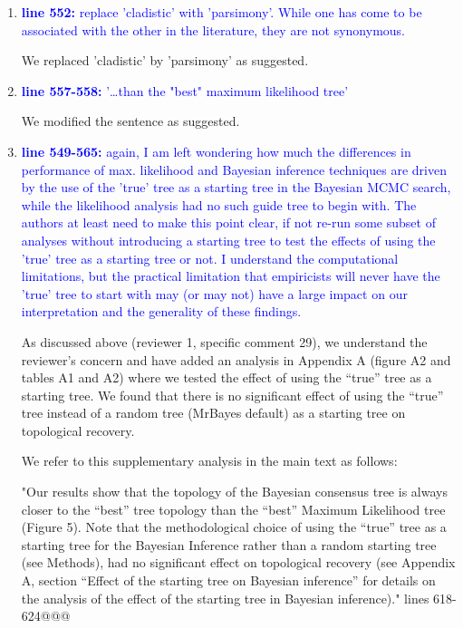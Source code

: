 \documentclass[12pt,letterpaper]{article}
\begin{document}
\begin{enumerate}
\item{\textcolor{blue}{\textbf{line 552:} replace 'cladistic' with 'parsimony'. While one has come to be associated with the other in the literature, they are not synonymous. }}

We replaced 'cladistic' by 'parsimony' as suggested.

\item{\textcolor{blue}{\textbf{line 557-558:} '…than the "best" maximum likelihood tree'}}

We modified the sentence as suggested.

\item{\textcolor{blue}{\textbf{line 549-565:} again, I am left wondering how much the differences in performance of max. likelihood and Bayesian inference techniques are driven by the use of the 'true' tree as a starting tree in the Bayesian MCMC search, while the likelihood analysis had no such guide tree to begin with. The authors at least need to make this point clear, if not re-run some subset of analyses without introducing a starting tree to test the effects of using the 'true' tree as a starting tree or not. I understand the computational limitations, but the practical limitation that empiricists will never have the 'true' tree to start with may (or may not) have a large impact on our interpretation and the generality of these findings. }}

As discussed above (reviewer 1, specific comment 29), we understand the reviewer's concern and have added an analysis in Appendix A (figure A2 and tables A1 and A2) where we tested the effect of using the ``true'' tree as a starting tree. We found that there is no significant effect of using the ``true'' tree instead of a random tree (MrBayes default) as a starting tree on topological recovery.

We refer to this supplementary analysis in the main text as follows:

"Our results show that the topology of the Bayesian consensus tree is always closer to the ``best'' tree topology than the ``best'' Maximum Likelihood tree (Figure 5).
Note that the methodological choice of using the ``true'' tree as a starting tree for the Bayesian Inference rather than a random starting tree (see Methods), had no significant effect on topological recovery (see Appendix A, section ``Effect of the starting tree on Bayesian inference'' for details on the analysis of the effect of the starting tree in Bayesian inference)." lines 618-624@@@


\end{enumerate}
\end{document}
